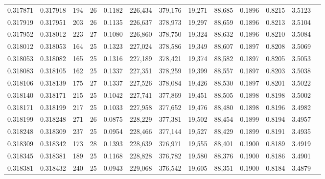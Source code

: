 \begin{tabular}{rrrrrrrrrrrrr}
0.317871 & 0.317918 &   194 &  26 &                                     0.1182 & 226,434 & 379,176 &  19,271 &  88,685 & 0.1896 & 0.8215 & 3.5123 \\
0.317919 & 0.317951 &   203 &  26 &                                     0.1135 & 226,637 & 378,973 &  19,297 &  88,659 & 0.1896 & 0.8213 & 3.5104 \\
0.317952 & 0.318012 &   223 &  27 &                                     0.1080 & 226,860 & 378,750 &  19,324 &  88,632 & 0.1896 & 0.8210 & 3.5084 \\
0.318012 & 0.318053 &   164 &  25 &                                     0.1323 & 227,024 & 378,586 &  19,349 &  88,607 & 0.1897 & 0.8208 & 3.5069 \\
0.318053 & 0.318082 &   165 &  25 &                                     0.1316 & 227,189 & 378,421 &  19,374 &  88,582 & 0.1897 & 0.8205 & 3.5053 \\
0.318083 & 0.318105 &   162 &  25 &                                     0.1337 & 227,351 & 378,259 &  19,399 &  88,557 & 0.1897 & 0.8203 & 3.5038 \\
0.318106 & 0.318139 &   175 &  27 &                                     0.1337 & 227,526 & 378,084 &  19,426 &  88,530 & 0.1897 & 0.8201 & 3.5022 \\
0.318140 & 0.318171 &   215 &  25 &                                     0.1042 & 227,741 & 377,869 &  19,451 &  88,505 & 0.1898 & 0.8198 & 3.5002 \\
0.318171 & 0.318199 &   217 &  25 &                                     0.1033 & 227,958 & 377,652 &  19,476 &  88,480 & 0.1898 & 0.8196 & 3.4982 \\
0.318199 & 0.318248 &   271 &  26 &                                     0.0875 & 228,229 & 377,381 &  19,502 &  88,454 & 0.1899 & 0.8194 & 3.4957 \\
0.318248 & 0.318309 &   237 &  25 &                                     0.0954 & 228,466 & 377,144 &  19,527 &  88,429 & 0.1899 & 0.8191 & 3.4935 \\
0.318309 & 0.318342 &   173 &  28 &                                     0.1393 & 228,639 & 376,971 &  19,555 &  88,401 & 0.1900 & 0.8189 & 3.4919 \\
0.318345 & 0.318381 &   189 &  25 &                                     0.1168 & 228,828 & 376,782 &  19,580 &  88,376 & 0.1900 & 0.8186 & 3.4901 \\
0.318381 & 0.318432 &   240 &  25 &                                     0.0943 & 229,068 & 376,542 &  19,605 &  88,351 & 0.1900 & 0.8184 & 3.4879 \\

\end{tabular}
